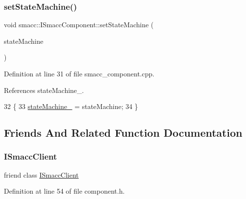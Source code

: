 \subsubsection{\texorpdfstring{set\+State\+Machine()}{setStateMachine()}}
{\footnotesize\ttfamily void smacc\+::\+I\+Smacc\+Component\+::set\+State\+Machine (\begin{DoxyParamCaption}\item[{\hyperlink{classsmacc_1_1ISmaccStateMachine}{I\+Smacc\+State\+Machine} $\ast$}]{state\+Machine }\end{DoxyParamCaption})\hspace{0.3cm}{\ttfamily [protected]}}



Definition at line 31 of file smacc\+\_\+component.\+cpp.



References state\+Machine\+\_\+.


\begin{DoxyCode}
32 \{
33     \hyperlink{classsmacc_1_1ISmaccComponent_ae3f37acc1679f79299b86872d4b1f80f}{stateMachine\_} = stateMachine;
34 \}
\end{DoxyCode}


\subsection{Friends And Related Function Documentation}
\mbox{\label{classsmacc_1_1ISmaccComponent_a64e981df7a9da02075b7668b3391ca1e}} 
\subsubsection{\texorpdfstring{I\+Smacc\+Client}{ISmaccClient}}
{\footnotesize\ttfamily friend class \hyperlink{classsmacc_1_1ISmaccClient}{I\+Smacc\+Client}\hspace{0.3cm}{\ttfamily [friend]}}



Definition at line 54 of file component.\+h.

\mbox{\label{classsmacc_1_1ISmaccComponent_a7205cc84a71fea903124d54d01e99a68}} 
